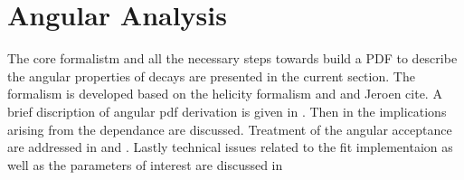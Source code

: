 

\section{Angular Analysis}
\label{Angular_Analysis}

The core formalistm and all the necessary steps towards build a PDF to describe the angular properties of \BJpsiKst decays are presented in
the current section. The formalism is developed based on the helicity formalism \cite{} and \cite{} and Jeroen cite. A brief discription of 
angular pdf derivation is given in . Then in  the implications arising from the
\mkpi dependance are discussed. Treatment of the angular acceptance are addressed in  and .
Lastly technical issues related to the fit implementaion as well as the \ACP parameters of interest are discussed in 



